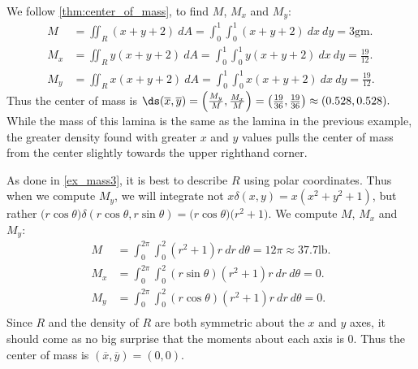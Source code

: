 {We follow \autoref{thm:center_of_mass}, to find $M$, $M_x$ and $M_y$:
\begin{align*}
M &= \iint_R (x+y+2)\ dA = \int_0^1\int_0^1 (x+y+2)\ dx\ dy =3\text{gm}.\\
M_x &= \iint_R y(x+y+2)\ dA = \int_0^1\int_0^1 y(x+y+2)\ dx\ dy =\frac{19}{12}.\\
M_y &= \iint_R x(x+y+2)\ dA = \int_0^1\int_0^1 x(x+y+2)\ dx\ dy =\frac{19}{12}.
\end{align*}
Thus the center of mass is $\ds (\overline{x},\overline{y}) = \left(\frac{M_y}M,\frac{M_x}M\right) = \left(\frac{19}{36},\frac{19}{36}\right) \approx (0.528,0.528).$ While the mass of this lamina is the same as the lamina in the previous example, the greater density found with greater $x$ and $y$ values pulls the center of mass from the center slightly towards the upper righthand corner.}

{As done in \autoref{ex_mass3}, it is best to describe $R$ using polar coordinates.
Thus when we compute $M_y$, we will integrate not $x\delta(x,y) = x(x^2+y^2+1)$, but rather $\big(r\cos\theta\big)\delta(r\cos\theta,r\sin\theta) = \big(r\cos\theta\big)\big(r^2+1\big).$ We compute $M$, $M_x$ and $M_y$:
\begin{align*}
M &= \int_0^{2\pi}\int_0^2 (r^2+1)r\ dr\ d\theta = 12\pi\approx 37.7\text{lb}.\\
M_x &= \int_0^{2\pi}\int_0^2 (r\sin\theta)(r^2+1)r \ dr\ d\theta = 0.\\
M_y &= \int_0^{2\pi}\int_0^2 (r\cos\theta)(r^2+1)r \ dr\ d\theta = 0.\\
\end{align*}
Since $R$ and the density of $R$ are both symmetric about the $x$ and $y$ axes, it should come as no big surprise that the moments about each axis is 0. Thus the center of mass is $(\overline{x},\overline{y})=(0,0)$. }

